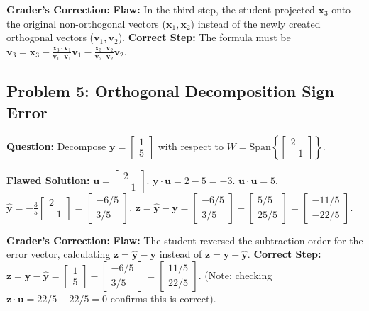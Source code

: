 \documentclass[11pt, letterpaper]{article}
\theoremstyle{definition}
\theoremstyle{remark}
\begin{document}
\textbf{Grader's Correction:}
\textbf{Flaw:} In the third step, the student projected $\mathbf{x}_3$ onto the original non-orthogonal vectors ($\mathbf{x}_1, \mathbf{x}_2$) instead of the newly created orthogonal vectors ($\mathbf{v}_1, \mathbf{v}_2$).
\textbf{Correct Step:} The formula must be $\mathbf{v}_3 = \mathbf{x}_3 - \frac{\mathbf{x}_3 \cdot \mathbf{v}_1}{\mathbf{v}_1 \cdot \mathbf{v}_1}\mathbf{v}_1 - \frac{\mathbf{x}_3 \cdot \mathbf{v}_2}{\mathbf{v}_2 \cdot \mathbf{v}_2}\mathbf{v}_2$.

\subsection{Problem 5: Orthogonal Decomposition Sign Error}
\textbf{Question:} Decompose $\mathbf{y} = \begin{bmatrix} 1 \\ 5 \end{bmatrix}$ with respect to $W = \text{Span}\left\{\begin{bmatrix} 2 \\ -1 \end{bmatrix}\right\}$.

\textbf{Flawed Solution:}
$\mathbf{u} = \begin{bmatrix} 2 \\ -1 \end{bmatrix}$.
$\mathbf{y} \cdot \mathbf{u} = 2 - 5 = -3$. $\mathbf{u} \cdot \mathbf{u} = 5$.
$\hat{\mathbf{y}} = -\frac{3}{5}\begin{bmatrix} 2 \\ -1 \end{bmatrix} = \begin{bmatrix} -6/5 \\ 3/5 \end{bmatrix}$.
$\mathbf{z} = \hat{\mathbf{y}} - \mathbf{y} = \begin{bmatrix} -6/5 \\ 3/5 \end{bmatrix} - \begin{bmatrix} 5/5 \\ 25/5 \end{bmatrix} = \begin{bmatrix} -11/5 \\ -22/5 \end{bmatrix}$.

\textbf{Grader's Correction:}
\textbf{Flaw:} The student reversed the subtraction order for the error vector, calculating $\mathbf{z} = \hat{\mathbf{y}} - \mathbf{y}$ instead of $\mathbf{z} = \mathbf{y} - \hat{\mathbf{y}}$.
\textbf{Correct Step:} $\mathbf{z} = \mathbf{y} - \hat{\mathbf{y}} = \begin{bmatrix} 1 \\ 5 \end{bmatrix} - \begin{bmatrix} -6/5 \\ 3/5 \end{bmatrix} = \begin{bmatrix} 11/5 \\ 22/5 \end{bmatrix}$. (Note: checking $\mathbf{z} \cdot \mathbf{u} = 22/5 - 22/5 = 0$ confirms this is correct).
\end{document}
